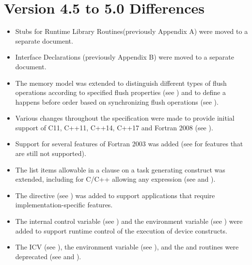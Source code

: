 \section{Version 4.5 to 5.0 Differences}
\label{sec:Version 4.5 to 5.0 Differences}
\begin{itemize}
\item Stubs for Runtime Library Routines(previously Appendix A) were moved to a separate document.
\item Interface Declarations (previously Appendix B) were moved to a separate document.

\item The memory model was extended to distinguish different types of flush
      operations according to specified flush properties (see
      ) and to define a happens
      before order based on synchronizing flush operations
      (see ).

\item Various changes throughout the specification were made to provide
      initial support of C11, C++11, C++14, C++17 and Fortran 2008 (see
      ).

\item Support for several features of Fortran 2003 was added (see
       for features that are still
      not supported).

\item The list items allowable in a  clause on a task generating
      construct was extended, including for C/C++ allowing any 
      expression (see  and
      ).

\item The  directive (see ) was
      added to support applications that require implementation-specific
      features.

\item The  internal control variable (see
      ) and the
       environment variable (see
      ) were added to support runtime
      control of the execution of device constructs.

\item The  ICV (see ), the
       environment variable (see ),
      and the  and  routines
      were deprecated (see  and
      ).


\end{itemize}
